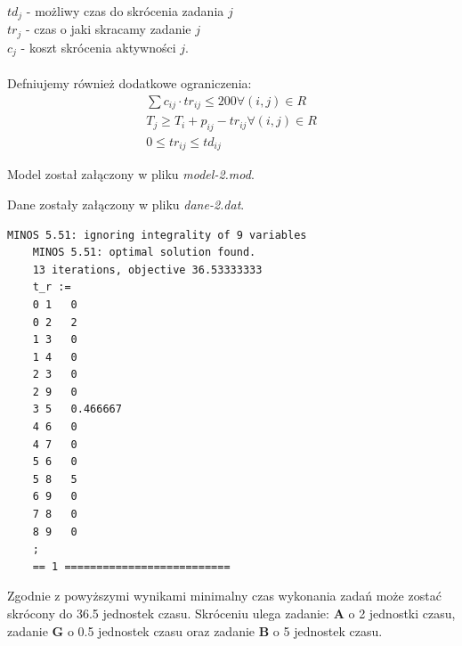 \documentclass[
    12pt, %
]{../fphw}
\begin{document}
\(td_j\) - możliwy czas do skrócenia zadania \(j\) \\
\(tr_j\) - czas o jaki skracamy zadanie \(j\) \\
\(c_j\) - koszt skrócenia aktywności \(j\). \\ \\
Defniujemy również dodatkowe ograniczenia:
\begin{align*}
    \sum c_{ij} \cdot tr_{ij} \leq 200 \forall (i, j) \in R \\
    T_j \geq T_i + p_{ij} - tr_{ij} \forall (i,j) \in R     \\
    0 \leq tr_{ij} \leq td_{ij}
\end{align*}

Model został załączony w pliku \textit{model-2.mod}.

Dane zostały załączony w pliku \textit{dane-2.dat}.
\begin{lstlisting}[caption=Rozwiązanie znalezione solwerem minos]
    MINOS 5.51: ignoring integrality of 9 variables
    MINOS 5.51: optimal solution found.
    13 iterations, objective 36.53333333
    t_r :=
    0 1   0
    0 2   2
    1 3   0
    1 4   0
    2 3   0
    2 9   0
    3 5   0.466667
    4 6   0
    4 7   0
    5 6   0
    5 8   5
    6 9   0
    7 8   0
    8 9   0
    ;
    == 1 ==========================
\end{lstlisting}
Zgodnie z powyższymi wynikami minimalny czas wykonania zadań może zostać skrócony do 36.5 jednostek czasu.
Skróceniu ulega zadanie: \textbf{A} o 2 jednostki czasu, zadanie \textbf{G} o 0.5 jednostek czasu
oraz zadanie \textbf{B} o 5 jednostek czasu.
\end{document}
